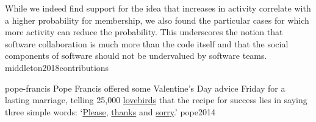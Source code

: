\documentclass{article}
\begin{document}
  {While we indeed find support for the idea that increases in activity correlate with a higher probability for membership, we also found the particular cases for which more activity can reduce the probability. This underscores the notion that software collaboration is much more than the code itself and that the social components of software should not be undervalued by software teams.}
  {middleton2018contributions}

\lnQuote
  {pope-francis}
  {Pope Francis offered some Valentine’s Day advice Friday for a lasting marriage, telling 25,000 \ul{lovebirds} that the recipe for success lies in saying three simple words: `\ul{Please}, \ul{thanks} and \ul{sorry}.'{}}
  {pope2014}
\end{document}

